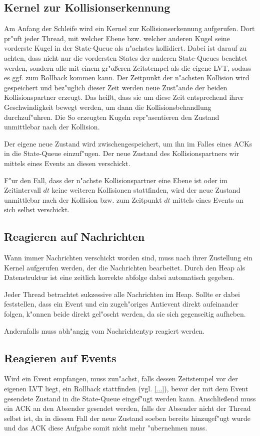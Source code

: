 \documentclass[a4paper, 10pt, openright, parskip, chapterprefix]{scrreprt}
\begin{document}
\subsection{Kernel zur Kollisionserkennung}
Am Anfang der Schleife wird ein Kernel zur Kollisionserkennung aufgerufen. Dort pr"uft jeder Thread, mit welcher Ebene
bzw. welcher anderen Kugel seine vorderste Kugel in der State-Queue als n"achstes kollidiert. Dabei ist
darauf zu achten, dass nicht nur die vordersten States der anderen State-Queues beachtet werden, sondern alle mit einem
gr"o\ss eren Zeitstempel als die eigene LVT, sodass es ggf. zum Rollback kommen kann. Der Zeitpunkt der n"achsten
Kollision wird gespeichert und bez"uglich dieser Zeit werden neue Zust"ande der beiden Kollisionspartner erzeugt. Das
hei\ss t, dass sie um diese Zeit entsprechend ihrer Geschwindigkeit bewegt werden, um dann die Kollisionsbehandlung
durchzuf"uhren. Die So erzeugten Kugeln repr"asentieren den Zustand unmittlebar nach der Kollision.

Der eigene neue Zustand wird zwischengespeichert, um ihn im Falles eines ACKs in die State-Queue einzuf"ugen. Der neue
Zustand des Kollisionspartners wir mittels eines Events an diesen verschickt.

F"ur den Fall, dass der n"achste Kollisionspartner eine Ebene ist oder im Zeitintervall $dt$ keine weiteren Kollisionen
stattfinden, wird der neue Zustand unmittlebar nach der Kollision bzw. zum Zeitpunkt $dt$ mittels eines Events an sich
selbst verschickt.

\subsection{Reagieren auf Nachrichten}
Wann immer Nachrichten verschickt worden sind, muss nach ihrer Zustellung ein Kernel aufgerufen werden, der die
Nachrichten bearbeitet. Durch den Heap als Datenstruktur ist eine zeitlich korrekte abfolge dabei automatisch gegeben.

Jeder Thread betrachtet sukzessive alle Nachrichten im Heap. Sollte er dabei feststellen, dass ein Event und ein
zugeh"origes Antievent direkt aufeinander folgen, k"onnen beide direkt gel"oscht werden, da sie sich gegenseitig
aufheben.

Andernfalls muss abh"angig vom Nachrichtentyp reagiert werden.

\subsection{Reagieren auf Events}
Wird ein Event empfangen, muss zun"achst, falls dessen Zeitstempel vor der eigenen LVT liegt, 
ein Rollback stattfinden (vgl. \ref{...}), bevor der mit dem Event gesendete
Zustand in die State-Queue eingef"ugt werden kann. Anschlie\ss end muss ein ACK an den Absender gesendet werden, falls
der Absender nicht der Thread selbst ist, da in diesem Fall der neue Zustand soeben
bereits hinzugef"ugt wurde und das ACK diese Aufgabe somit nicht mehr "ubernehmen muss.
\end{document}
